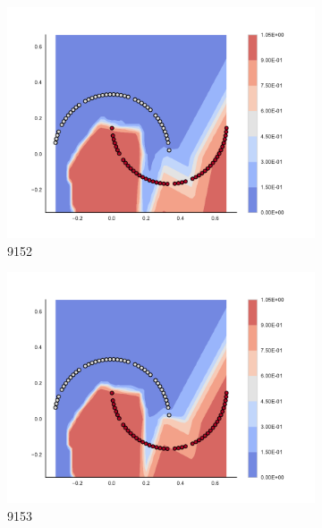 \begin{figure}[h]
\begin{subfigure}[b]{0.09\textwidth}
    \includegraphics[clip, trim=2.35cm 1.75cm 4.5cm 0cm,width=\textwidth]{img/convergence/9152.pdf}
    \caption{9152}
    \label{fig:convergence_9152}
\end{subfigure}
%
\begin{subfigure}[b]{0.09\textwidth}
    \includegraphics[clip, trim=2.35cm 1.75cm 4.5cm 0cm,width=\textwidth]{img/convergence/9153.pdf}
    \caption{9153}
    \label{fig:convergence_9153}
\end{subfigure}
%
\begin{subfigure}[b]{0.09\textwidth}

\end{subfigure}
\end{figure}
